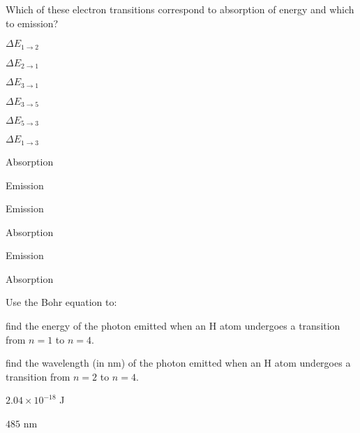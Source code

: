 \documentclass[main.tex]{subfiles}
\begin{document}
\begin{multicols*}{2}
\vspace{-0.0cm}\begin{question}[ID=\the\value{numA}]
Which of these electron transitions correspond to absorption of energy and which to emission?
\begin{enumerate}[label=(\alph*)]\begin{multicols*}{2}
\item $\Delta E_{1\rightarrow 2}$  %
\item $\Delta E_{2\rightarrow 1}$	%
\item $\Delta E_{3\rightarrow 1}$	%
\item  $\Delta E_{3\rightarrow 5}$	%
\item $\Delta E_{5\rightarrow 3}$	%
\item $\Delta E_{1\rightarrow 3}$	%
\end{multicols*}\end{enumerate}
\end{question}
\begin{solution}
\begin{inparaenum}[(a)]
\item  Absorption 
\item  Emission
\item  Emission
\item  Absorption
\item  Emission
\item  Absorption
\end{inparaenum}\hspace{0.1cm}\end{solution}

 
\vspace{-0.5cm}\begin{question}[ID=\the\value{numA}]
Use the Bohr equation to:
 \begin{inparaenum}[(a)]
\item   find the energy of the photon emitted when an H atom undergoes a transition from $n=1$ to $n=4$.
\item   find the wavelength (in nm) of the photon emitted when an H atom undergoes a transition from $n=2$ to $n=4$.
\end{inparaenum}
 \end{question}
\begin{solution}
\begin{inparaenum}[(a)]
\item   $2.04\times10^{-18}$ J
\item $485$ nm
\end{inparaenum}\hspace{0.1cm}\end{solution}


\end{multicols*}
\end{document}
